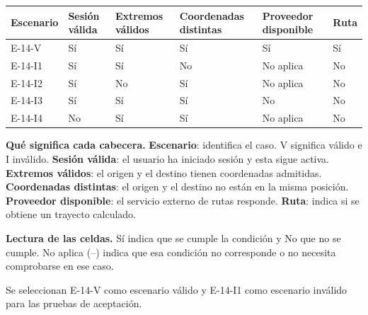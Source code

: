 \begingroup\fontsize{7.8}{11}\selectfont\setlength{\tabcolsep}{3pt}
\begin{tabularx}{\linewidth}{@{}*{6}{Y}@{}}\toprule
\textbf{Escenario} & \textbf{Sesión válida} & \textbf{Extremos válidos} & \textbf{Coordenadas distintas} & \textbf{Proveedor disponible} & \textbf{Ruta}\\\midrule
E-14-V & Sí & Sí & Sí & Sí & Sí\\[3pt]
E-14-I1 & Sí & Sí & No & No aplica & No\\[3pt]
E-14-I2 & Sí & No & Sí & No aplica & No\\[3pt]
E-14-I3 & Sí & Sí & Sí & No & No\\[3pt]
E-14-I4 & No & Sí & Sí & No aplica & No\\[3pt]
\bottomrule\end{tabularx}\endgroup\par
{\fontsize{9}{11}\selectfont\textbf{Qué significa cada cabecera.} \textbf{Escenario}: identifica el caso. V significa válido e I inválido. \textbf{Sesión válida}: el usuario ha iniciado sesión y esta sigue activa. \textbf{Extremos válidos}: el origen y el destino tienen coordenadas admitidas. \textbf{Coordenadas distintas}: el origen y el destino no están en la misma posición. \textbf{Proveedor disponible}: el servicio externo de rutas responde. \textbf{Ruta}: indica si se obtiene un trayecto calculado.\par\textbf{Lectura de las celdas.} Sí indica que se cumple la condición y No que no se cumple. No aplica (--) indica que esa condición no corresponde o no necesita comprobarse en ese caso.\par}


Se seleccionan E-14-V como escenario válido y E-14-I1 como escenario inválido para las pruebas de aceptación.\par


